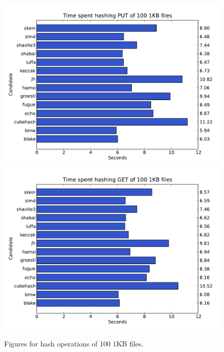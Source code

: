 \documentclass[english,12pt,a4paper]{book}
\begin{document}
\begin{figure}[h!]
    \centering
    \includegraphics[width=0.9\columnwidth]{graphs/TimespenthashingPUTof1001KBfiles.pdf}
    \includegraphics[width=0.9\columnwidth]{graphs/TimespenthashingGETof1001KBfiles.pdf}
    \caption{Figures for hash operations of 100 1KB files.}
    \label{fig:graph:1001kb}
\end{figure}
\end{document}
